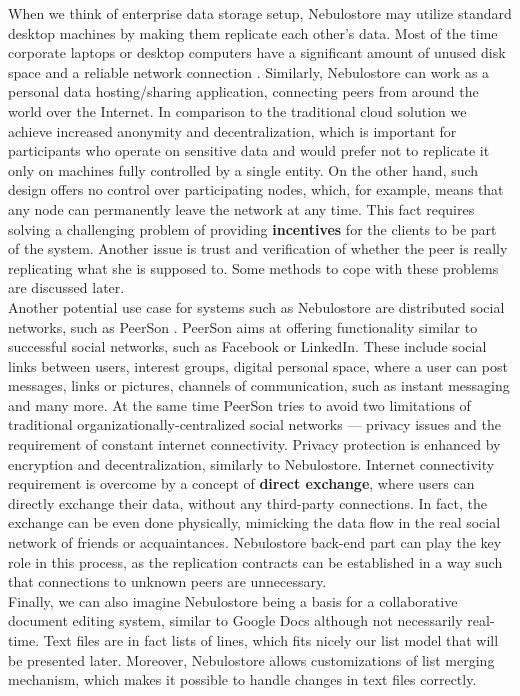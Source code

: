 \documentclass{pracamgren}
\begin{document}
When we think of enterprise data storage setup, Nebulostore may utilize standard desktop machines by making them replicate each other's data. Most of the time corporate laptops or desktop computers have a significant amount of unused disk space and a reliable network connection \cite{farsite}. Similarly, Nebulostore can work as a personal data hosting/sharing application, connecting peers from around the world over the Internet. In comparison to the traditional cloud solution we achieve increased anonymity and decentralization, which is important for participants who operate on sensitive data and would prefer not to replicate it only on machines fully controlled by a single entity. On the other hand, such design offers no control over participating nodes, which, for example, means that any node can permanently leave the network at any time. This fact requires solving a challenging problem of providing {\bf incentives} for the clients to be part of the system. Another issue is trust and verification of whether the peer is really replicating what she is supposed to. Some methods to cope with these problems are discussed later.\\

Another potential use case for systems such as Nebulostore are distributed social networks, such as PeerSon \cite{peerson}. PeerSon aims at offering functionality similar to successful social networks, such as Facebook or LinkedIn. These include social links between users, interest groups, digital personal space, where a user can post messages, links or pictures, channels of communication, such as instant messaging and many more. At the same time PeerSon tries to avoid two limitations of traditional organizationally-centralized social networks --- privacy issues and the requirement of constant internet connectivity. Privacy protection is enhanced by encryption and decentralization, similarly to Nebulostore. Internet connectivity requirement is overcome by a concept of {\bf direct exchange}, where users can directly exchange their data, without any third-party connections. In fact, the exchange can be even done physically, mimicking the data flow in the real social network of friends or acquaintances. Nebulostore back-end part can play the key role in this process, as the replication contracts can be established in a way such that connections to unknown peers are unnecessary.\\

Finally, we can also imagine Nebulostore being a basis for a collaborative document editing system, similar to Google Docs although not necessarily real-time. Text files are in fact lists of lines, which fits nicely our list model that will be presented later. Moreover, Nebulostore allows customizations of list merging mechanism, which makes it possible to handle changes in text files correctly.\\
\end{document}
